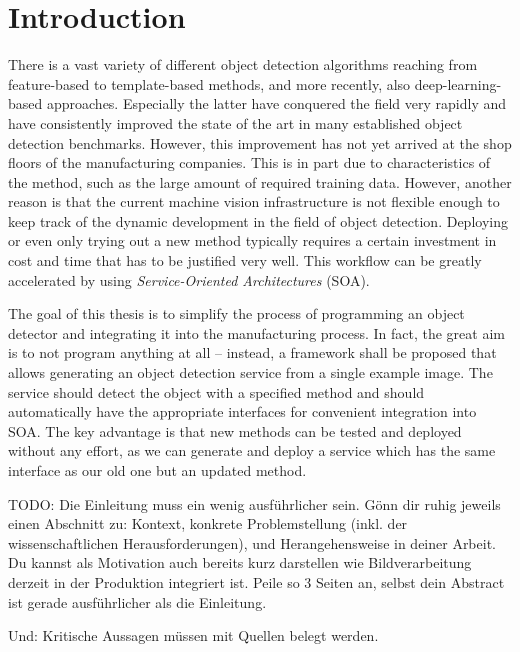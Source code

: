 \chapter{Introduction\label{cha:chapter1}}
There is a vast variety of different object detection algorithms reaching from feature-based to template-based methods, and more recently, also deep-learning-based approaches. Especially the latter have conquered the field very rapidly and have consistently improved the state of the art in many established object detection benchmarks. However, this improvement has not yet arrived at the shop floors of the manufacturing companies. This is in part due to characteristics of the method, such as the large amount of required training data. However, another reason is that the current machine vision infrastructure is not flexible enough to keep track of the dynamic development in the field of object detection. Deploying or even only trying out a new method typically requires a certain investment in cost and time that has to be justified very well. This workflow can be greatly accelerated by using \textit{Service-Oriented Architectures} (SOA).

The goal of this thesis is to simplify the process of programming an object detector and integrating it into the manufacturing process. In fact, the great aim is to not program anything at all – instead, a framework shall be proposed that allows generating an object detection service from a single example image.
The service should detect the object with a specified method and should automatically have the appropriate interfaces for convenient integration into SOA. The key advantage is that new methods can be tested and deployed without any effort, as we can generate and deploy a service which has the same interface as our old one but an updated method.


 
 TODO: Die Einleitung muss ein wenig ausführlicher sein. Gönn dir ruhig jeweils einen Abschnitt zu: Kontext, konkrete Problemstellung (inkl. der wissenschaftlichen Herausforderungen), und Herangehensweise in deiner Arbeit.
Du kannst als Motivation auch bereits kurz darstellen wie Bildverarbeitung derzeit in der Produktion integriert ist. Peile so 3 Seiten an, selbst dein Abstract ist gerade ausführlicher als die Einleitung.

Und: Kritische Aussagen müssen mit Quellen belegt werden.